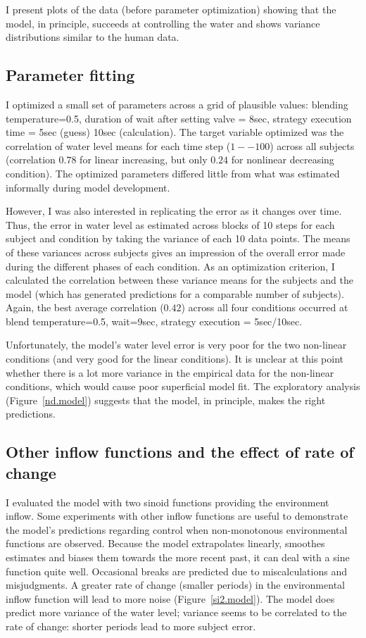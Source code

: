\documentclass[twocolumn]{article}
\begin{document}
I present plots of the data (before parameter optimization) showing that the model, in principle, succeeds at controlling the water and shows variance distributions similar to the human data.  


\subsection{Parameter fitting}

I optimized a small set of parameters across a grid of plausible values: blending temperature=0.5, duration of wait after setting valve = 8sec,  strategy execution time = 5sec (guess) 10sec (calculation).  The target variable optimized was the correlation of water level means for each time step ($1--100$) across all subjects (correlation $0.78$ for linear increasing, but only $0.24$ for nonlinear decreasing condition).  The optimized parameters differed little from what was estimated informally during model development.

However, I was also interested in replicating the error as it changes over time.  Thus, the error in water level as estimated across blocks of 10 steps for each subject and condition by taking the variance of each 10 data points.  The means of these variances across subjects gives an impression of the overall error made during the different phases of each condition.  As an optimization criterion, I calculated the correlation between these variance means for the subjects and the model (which has generated predictions for a comparable number of subjects).  Again, the best average correlation ($0.42$) across all four conditions occurred at blend temperature=0.5, wait=9sec, strategy execution = 5sec/10sec.


Unfortunately, the model's water level error is very poor for the two non-linear conditions (and very good for the linear conditions).  It is unclear at this point whether there is a lot more variance in the empirical data for the non-linear conditions, which would cause poor superficial model fit.  The exploratory analysis (Figure~\ref{nd.model}) suggests that the model, in principle, makes the right predictions.


\subsection{Other inflow functions and the effect of rate of change}

I evaluated the model with two sinoid functions providing the environment inflow.  
Some experiments with other inflow functions are useful to demonstrate the model's predictions regarding control when non-monotonous environmental functions are observed.  Because the model extrapolates linearly, smoothes estimates and biases them towards the more recent past, it can deal with a sine function quite well.  Occasional breaks are predicted due to miscalculations and misjudgments.   A greater rate of change (smaller periods) in the environmental inflow function will lead to more noise (Figure~\ref{si2.model}).
The model does predict more variance of the water level; variance seems to be correlated to the rate of change: shorter periods lead to more subject error.
\end{document}
